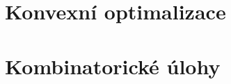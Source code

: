 \documentclass[a4paper,oneside,12pt]{book}
\theoremstyle{definition}
\theoremstyle{plain}
\theoremstyle{remark}
\begin{document}
\tableofcontents

\setcounter{page}{1}

\pagebreak


{
  \pagestyle{plain}
  
  
  
  \clearpage
}


\part{Konvexní optimalizace}









\clearpage


\part{Kombinatorické úlohy}







\clearpage




\clearpage




\end{document}
